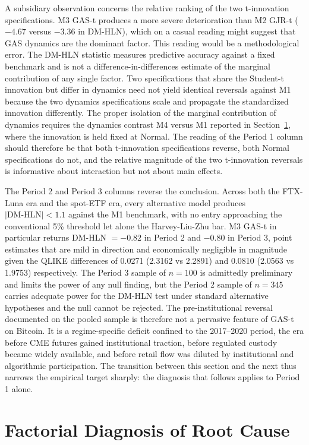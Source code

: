 A subsidiary observation concerns the relative ranking of the two t-innovation specifications. M3 GAS-t produces a more severe deterioration than M2 GJR-t ($-4.67$ versus $-3.36$ in DM-HLN), which on a casual reading might suggest that GAS dynamics are the dominant factor. This reading would be a methodological error. The DM-HLN statistic measures predictive accuracy against a fixed benchmark and is not a difference-in-differences estimate of the marginal contribution of any single factor. Two specifications that share the Student-t innovation but differ in dynamics need not yield identical reversals against M1 because the two dynamics specifications scale and propagate the standardized innovation differently. The proper isolation of the marginal contribution of dynamics requires the dynamics contrast M4 versus M1 reported in Section~\ref{sec:results2}, where the innovation is held fixed at Normal. The reading of the Period 1 column should therefore be that both t-innovation specifications reverse, both Normal specifications do not, and the relative magnitude of the two t-innovation reversals is informative about interaction but not about main effects.

The Period 2 and Period 3 columns reverse the conclusion. Across both the FTX-Luna era and the spot-ETF era, every alternative model produces $|\text{DM-HLN}| < 1.1$ against the M1 benchmark, with no entry approaching the conventional 5\% threshold let alone the Harvey-Liu-Zhu bar. M3 GAS-t in particular returns DM-HLN $= -0.82$ in Period 2 and $-0.80$ in Period 3, point estimates that are mild in direction and economically negligible in magnitude given the QLIKE differences of 0.0271 (2.3162 vs 2.2891) and 0.0810 (2.0563 vs 1.9753) respectively. The Period 3 sample of $n = 100$ is admittedly preliminary and limits the power of any null finding, but the Period 2 sample of $n = 345$ carries adequate power for the DM-HLN test under standard alternative hypotheses and the null cannot be rejected. The pre-institutional reversal documented on the pooled sample is therefore not a pervasive feature of GAS-t on Bitcoin. It is a regime-specific deficit confined to the 2017--2020 period, the era before CME futures gained institutional traction, before regulated custody became widely available, and before retail flow was diluted by institutional and algorithmic participation. The transition between this section and the next thus narrows the empirical target sharply: the diagnosis that follows applies to Period 1 alone.

\section{Factorial Diagnosis of Root Cause}
\label{sec:results2}

